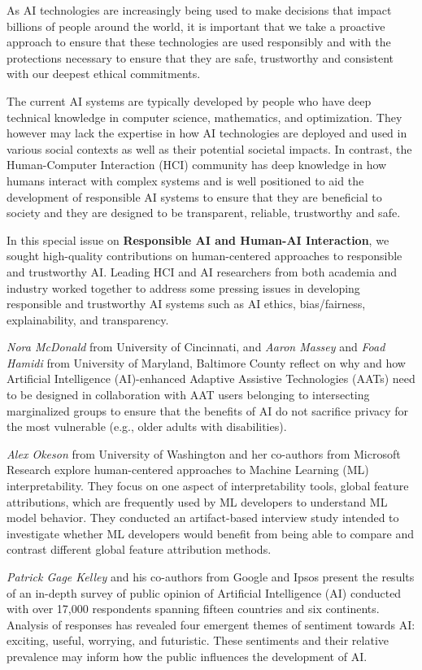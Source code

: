 \documentclass[11pt]{article}
\begin{document}
As AI technologies are increasingly being used to make decisions that impact billions of people around the world,  it is important that we take a proactive approach to ensure that these technologies are used responsibly and with the protections necessary to ensure that they are safe, trustworthy and consistent with our deepest ethical commitments. 
 
The current AI systems are typically developed by people who have deep technical knowledge in computer science, mathematics, and optimization. They however may lack the expertise in how AI technologies are deployed and used in various social contexts as well as their potential societal impacts.  In contrast, the Human-Computer Interaction (HCI) community has deep knowledge in how humans interact with complex systems and is well positioned to aid the development of responsible AI systems to ensure that they are beneficial to society and they are designed to be transparent, reliable, trustworthy and safe.  

In this special issue on \textbf{Responsible AI and Human-AI Interaction}, we sought high-quality contributions on human-centered approaches to responsible and trustworthy AI. Leading HCI and AI researchers from both academia and industry worked together to address some pressing issues in developing responsible and trustworthy AI systems such as AI ethics, bias/fairness, explainability, and transparency. 
  
\textit{Nora McDonald} from University of Cincinnati, and \textit{Aaron Massey} and \textit{Foad Hamidi} from University of Maryland, Baltimore County reflect on why and how Artificial Intelligence (AI)-enhanced Adaptive Assistive Technologies (AATs) need to be designed in collaboration with AAT users belonging to intersecting marginalized groups to ensure that the benefits of AI do not sacrifice privacy for the most vulnerable (e.g., older adults with disabilities).   

\textit{Alex Okeson} from University of Washington and her co-authors from Microsoft Research explore human-centered approaches to Machine Learning (ML) interpretability. They focus on one aspect of interpretability tools, global feature attributions, which are frequently used by ML developers to understand ML model behavior. They conducted an artifact-based interview study intended to investigate whether ML developers would benefit from being able to compare and contrast different global feature attribution methods.

\textit{Patrick Gage Kelley} and his co-authors from Google and Ipsos present the results of an in-depth survey of public opinion of Artificial Intelligence (AI) conducted with over 17,000 respondents spanning fifteen countries and six continents. Analysis of responses has revealed four emergent themes of sentiment towards AI: exciting, useful, worrying, and futuristic. These sentiments and their relative prevalence may inform how the public influences the development of AI.   
\end{document}
